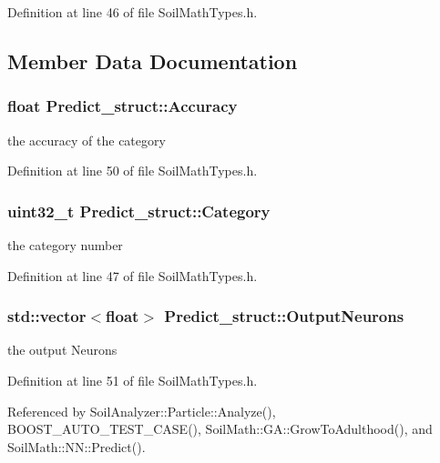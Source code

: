 Definition at line 46 of file Soil\+Math\+Types.\+h.



\subsection{Member Data Documentation}
\hypertarget{struct_predict__struct_a587f18ac05cd65437327a54261d1e22c}{}
\subsubsection[{Accuracy}]{\setlength{\rightskip}{0pt plus 5cm}float Predict\+\_\+struct\+::\+Accuracy}\label{struct_predict__struct_a587f18ac05cd65437327a54261d1e22c}
the accuracy of the category 

Definition at line 50 of file Soil\+Math\+Types.\+h.

\hypertarget{struct_predict__struct_a9ec8092acf251221ad920454472f734b}{}
\subsubsection[{Category}]{\setlength{\rightskip}{0pt plus 5cm}uint32\+\_\+t Predict\+\_\+struct\+::\+Category}\label{struct_predict__struct_a9ec8092acf251221ad920454472f734b}
the category number 

Definition at line 47 of file Soil\+Math\+Types.\+h.

\hypertarget{struct_predict__struct_aa0708cae93baa061f21452537e86d3bd}{}
\subsubsection[{Output\+Neurons}]{\setlength{\rightskip}{0pt plus 5cm}std\+::vector$<$float$>$ Predict\+\_\+struct\+::\+Output\+Neurons}\label{struct_predict__struct_aa0708cae93baa061f21452537e86d3bd}
the output Neurons 

Definition at line 51 of file Soil\+Math\+Types.\+h.



Referenced by Soil\+Analyzer\+::\+Particle\+::\+Analyze(), B\+O\+O\+S\+T\+\_\+\+A\+U\+T\+O\+\_\+\+T\+E\+S\+T\+\_\+\+C\+A\+S\+E(), Soil\+Math\+::\+G\+A\+::\+Grow\+To\+Adulthood(), and Soil\+Math\+::\+N\+N\+::\+Predict().

